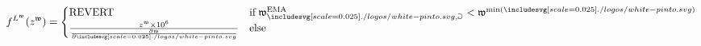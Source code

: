 \documentclass[class=article, crop=false]{standalone}
\begin{document}
    $$
        f^{L^{\mathfrak{w}}}(z^{\mathfrak{w}}) =
            \begin{cases}
                \text{REVERT}
                    & \text{if} \; \mathfrak{w}_{\pinto,\Game}^{\text{EMA}} < \mathfrak{w}^{\text{min}(\pinto)}  \\
                
                \frac{z^{\mathfrak{w}} \times 10^6}
                    {\frac{\partial \mathfrak{w}}
                            {\partial \pinto}}
                    & \text{else}
            \end{cases} 
    $$
\end{document}
